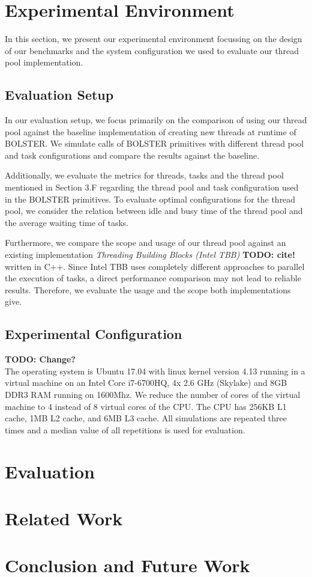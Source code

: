 \documentclass[conference]{IEEEtran}
\begin{document}
\section{Experimental Environment}	
In this section, we present our experimental environment focussing on the design of our benchmarks and the system configuration we used to evaluate our thread pool implementation.

\subsection{Evaluation Setup}
In our evaluation setup, we focus primarily on the comparison of using our thread pool against the baseline implementation of creating new threads at runtime of BOLSTER. We simulate calls of BOLSTER primitives with different thread pool and task configurations and compare the results against the baseline. 

Additionally, we evaluate the metrics for threads, tasks and the thread pool mentioned in Section 3.F regarding the thread pool and task configuration used in the BOLSTER primitives. To evaluate optimal configurations for the thread pool, we consider the relation between idle and busy time of the thread pool and the average waiting time of tasks.

Furthermore, we compare the scope and usage of our thread pool against an existing implementation \emph{Threading Building Blocks (Intel TBB)} \textbf{TODO: cite!} written in C++. Since Intel TBB uses completely different approaches to parallel the execution of tasks, a direct performance comparison may not lead to reliable results. Therefore, we evaluate the usage and the scope both implementations give.
 
\subsection{Experimental Configuration}
\textbf{TODO: Change?}\\The operating system is Ubuntu 17.04 with linux kernel version 4.13 running in a virtual machine on an Intel Core i7-6700HQ, 4x 2.6 GHz (Skylake) and 8GB DDR3 RAM running on 1600Mhz. We reduce the number of cores of the virtual machine to 4 instead of 8 virtual cores of the CPU. The CPU has 256KB L1 cache, 1MB L2 cache, and 6MB L3 cache. All simulations are repeated three times and a median value of all repetitions is used for evaluation. 	

\section{Evaluation}

\section{Related Work}

\section{Conclusion and Future Work}


 
\end{document}
